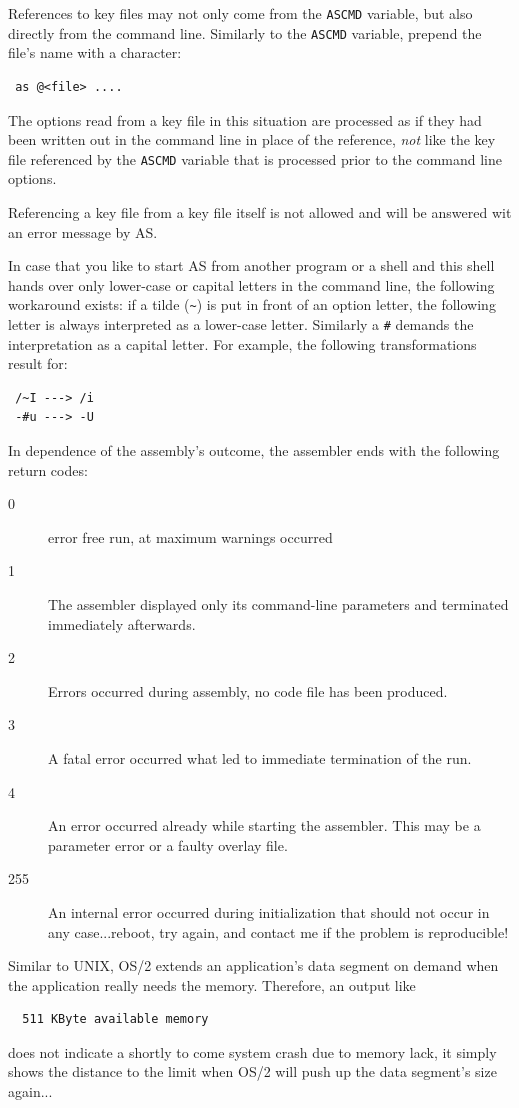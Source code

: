 \documentclass[12pt,twoside]{report}
\newcommand{\tty}[1]{{\tt #1}}
\newcommand{\asname}{{AS}}
\begin{document}
References to key files may not only come from the {\tt ASCMD} variable,
but also directly from the command line.  Similarly to the {\tt ASCMD}
variable, prepend the file's name with a \@ character:
\begin{verbatim}
 as @<file> ....
\end{verbatim}
The options read from a key file in this situation are processed as if
they had been written out in the command line in place of the reference,
{\em not} like the key file referenced by the {\tt ASCMD} variable that is
processed prior to the command line options.

Referencing a key file from a key file itself is not allowed and will be
answered wit an error message by \asname{}.

In case that you like to start \asname{} from another program or a shell and
this shell hands over only lower-case or capital letters in the
command line, the following workaround exists: if a tilde (\verb!~!) is put
in front of an option letter, the following letter is always
interpreted as a lower-case letter.  Similarly a \tty{\#} demands the
interpretation as a capital letter.  For example, the following
transformations result for:
\begin{verbatim}
 /~I ---> /i
 -#u ---> -U
\end{verbatim}
In dependence of the assembly's outcome, the assembler ends with
the following return codes:
\begin{description}
\item[0]{error free run, at maximum warnings occurred}
\item[1]{The assembler displayed only its command-line parameters and
         terminated immediately afterwards.}
\item[2]{Errors occurred during assembly, no code file has been produced.}
\item[3]{A fatal error occurred what led to immediate termination of the run.}
\item[4]{An error occurred already while starting the assembler.
         This may be a parameter error or a faulty overlay file.}
\item[255]{An internal error occurred during initialization that should not
         occur in any case...reboot, try again, and contact me if the
         problem is reproducible!}
\end{description}
Similar to UNIX, OS/2  extends an application's data
segment on demand when the application really needs the memory.
Therefore, an output like
\begin{verbatim}
  511 KByte available memory
\end{verbatim}
does not indicate a shortly to come system crash due to memory lack,
it simply shows the distance to the limit when OS/2 will push up the
data segment's size again...
\end{document}
